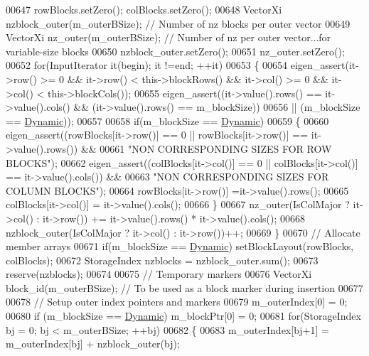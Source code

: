 \begin{DoxyCode}
00647       rowBlocks.setZero(); colBlocks.setZero();
00648       VectorXi nzblock\_outer(m\_outerBSize); \textcolor{comment}{// Number of nz blocks per outer vector}
00649       VectorXi nz\_outer(m\_outerBSize); \textcolor{comment}{// Number of nz per outer vector...for variable-size blocks}
00650       nzblock\_outer.setZero();
00651       nz\_outer.setZero();
00652       \textcolor{keywordflow}{for}(InputIterator it(begin); it !=end; ++it)
00653       \{
00654         eigen\_assert(it->row() >= 0 && it->row() < this->blockRows() && it->col() >= 0 && it->col() < 
      this->blockCols());
00655         eigen\_assert((it->value().rows() == it->value().cols() && (it->value().rows() == m\_blockSize))
00656                      || (m\_blockSize == \hyperlink{namespace_eigen_ad81fa7195215a0ce30017dfac309f0b2}{Dynamic}));
00657 
00658         \textcolor{keywordflow}{if}(m\_blockSize == \hyperlink{namespace_eigen_ad81fa7195215a0ce30017dfac309f0b2}{Dynamic})
00659         \{
00660           eigen\_assert((rowBlocks[it->row()] == 0 || rowBlocks[it->row()] == it->value().rows()) &&
00661               \textcolor{stringliteral}{"NON CORRESPONDING SIZES FOR ROW BLOCKS"});
00662           eigen\_assert((colBlocks[it->col()] == 0 || colBlocks[it->col()] == it->value().cols()) &&
00663               \textcolor{stringliteral}{"NON CORRESPONDING SIZES FOR COLUMN BLOCKS"});
00664           rowBlocks[it->row()] =it->value().rows();
00665           colBlocks[it->col()] = it->value().cols();
00666         \}
00667         nz\_outer(IsColMajor ? it->col() : it->row()) += it->value().rows() * it->value().cols();
00668         nzblock\_outer(IsColMajor ? it->col() : it->row())++;
00669       \}
00670       \textcolor{comment}{// Allocate member arrays}
00671       \textcolor{keywordflow}{if}(m\_blockSize == \hyperlink{namespace_eigen_ad81fa7195215a0ce30017dfac309f0b2}{Dynamic}) setBlockLayout(rowBlocks, colBlocks);
00672       StorageIndex nzblocks = nzblock\_outer.sum();
00673       reserve(nzblocks);
00674 
00675        \textcolor{comment}{// Temporary markers}
00676       VectorXi block\_id(m\_outerBSize); \textcolor{comment}{// To be used as a block marker during insertion}
00677 
00678       \textcolor{comment}{// Setup outer index pointers and markers}
00679       m\_outerIndex[0] = 0;
00680       \textcolor{keywordflow}{if} (m\_blockSize == \hyperlink{namespace_eigen_ad81fa7195215a0ce30017dfac309f0b2}{Dynamic})  m\_blockPtr[0] =  0;
00681       \textcolor{keywordflow}{for}(StorageIndex bj = 0; bj < m\_outerBSize; ++bj)
00682       \{
00683         m\_outerIndex[bj+1] = m\_outerIndex[bj] + nzblock\_outer(bj);

\end{DoxyCode}

